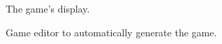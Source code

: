 \documentclass[runningheads,a4paper]{llncs}
\begin{document}
\begin{figure}[htb]
\centering
{}
\caption{The game's display.}
\end{figure}

\begin{figure}[htb]
\centering
{}
\caption{Game editor to automatically generate the game.}
\end{figure}
\end{document}
